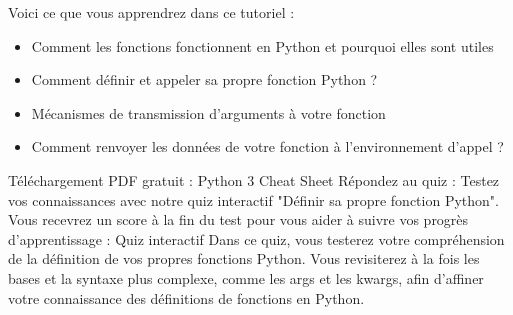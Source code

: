 Voici ce que vous apprendrez dans ce tutoriel :
\begin{itemize}
\item Comment les fonctions fonctionnent en Python et pourquoi elles sont utiles
\item Comment définir et appeler sa propre fonction Python ?
\item Mécanismes de transmission d'arguments à votre fonction
\item Comment renvoyer les données de votre fonction à l'environnement d'appel ?
\end{itemize}
Téléchargement PDF gratuit : Python 3 Cheat Sheet
 Répondez au quiz : Testez vos connaissances avec notre quiz interactif "Définir sa propre fonction Python". Vous recevrez un score à la fin du test pour vous aider à suivre vos progrès d'apprentissage :
Quiz interactif
Dans ce quiz, vous testerez votre compréhension de la définition de vos propres fonctions Python. Vous revisiterez à la fois les bases et la syntaxe plus complexe, comme les args et les kwargs, afin d'affiner votre connaissance des définitions de fonctions en Python.
